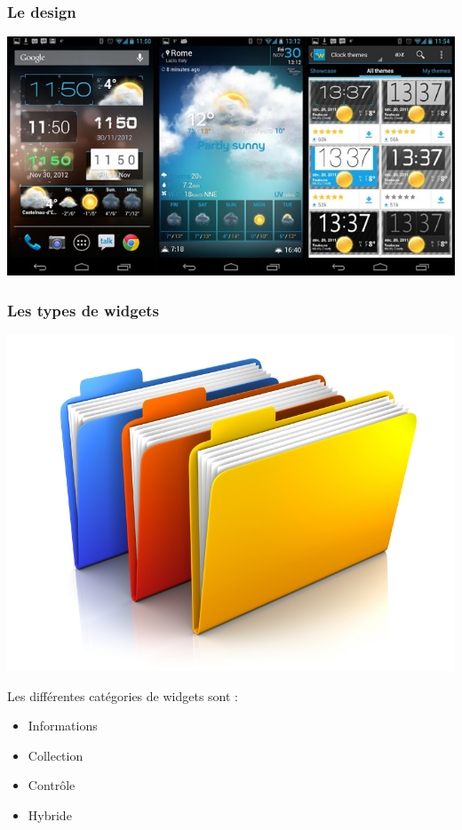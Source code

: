 \documentclass{beamer}
\begin{document}
\begin{frame}
\frametitle{Le design}
\begin{center}
\includegraphics[scale=0.4]{widgets.jpg}
\end{center}
\end{frame}


\begin{frame}
\frametitle{Les types de widgets}
\begin{center}
\includegraphics[scale=0.5]{folders.jpg}
\end{center}
\begin{block}{Les différentes catégories de widgets sont :}
\begin{itemize}
\item Informations
\item Collection
\item Contrôle
\item Hybride
\end{itemize}
\end{block}
\end{frame}
\end{document}
